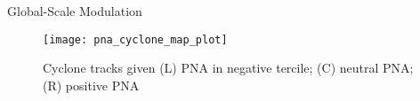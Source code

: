\begin{block}{Global-Scale Modulation}

    \begin{figure}
        \texttt{[image: pna\_cyclone\_map\_plot]}
        \caption{Cyclone tracks given (L) PNA in negative tercile; (C) neutral PNA; (R) positive PNA}
        \label{fig:track-given-pna}
    \end{figure}
\end{block}
